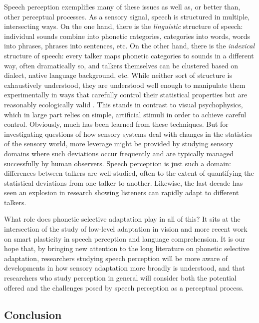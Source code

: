 Speech perception exemplifies many of these issues as well as, or better than, other perceptual processes.  As a sensory signal, speech is structured in multiple, intersecting ways.  On the one hand, there is the \emph{linguistic} structure of speech: individual sounds combine into phonetic categories, categories into words, words into phrases, phrases into sentences, etc.  On the other hand, there is the \emph{indexical} structure of speech: every talker maps phonetic categories to sounds in a different way, often dramatically so, and talkers themselves can be clustered based on dialect, native language background, etc.  While neither sort of structure is exhaustively understood, they are understood well enough to manipulate them experimentally in ways that carefully control their statistical properties but are reasonably ecologically valid \autocite{Allen2004,Clayards2008,Newman2001}.  This stands in contrast to visual psychophysics, which in large part relies on simple, artificial stimuli in order to achieve careful control.  Obviously, much has been learned from these techniques.  But for investigating questions of how sensory systems deal with changes in the statistics of the sensory world, more leverage might be provided by studying sensory domains where such deviations occur frequently and are typically managed successfully by human observers.  Speech perception is just such a domain: differences between talkers are well-studied, often to the extent of quantifying the statistical deviations from one talker to another.  Likewise, the last decade has seen an explosion in research showing listeners can rapidly adapt to different talkers.

What role does phonetic selective adaptation play in all of this?  It sits at the intersection of the study of low-level adaptation in vision and more recent work on smart plasticity in speech perception and language comprehension.  It is our hope that, by bringing new attention to the long literature on phonetic selective adaptation, researchers studying speech perception will be more aware of developments in how sensory adaptation more broadly is understood, and that researchers who study perception in general will consider both the potential offered and the challenges posed by speech perception as a perceptual process.

\subsection{Conclusion}
\label{sec:conclusion}

